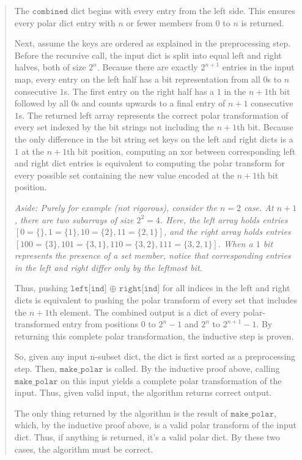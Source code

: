 \documentclass[11pt]{article}
\newcommand{\code}[1]{$\texttt{#1}$}
\begin{document}
\begin{enumerate}
\begin{enumerate}
\begin{quote}
    \medskip
    The \code{combined} dict begins with every entry from the left side. This ensures every polar dict entry with $n$ or fewer members from $0$ to $n$ is returned. 

    \medskip
    Next, assume the keys are ordered as explained in the preprocessing step. Before the recursive call, the input dict is split into equal left and right halves, both of size $2^n$. Because there are exactly $2^{n + 1}$ entries in the input map, every entry on the left half has a bit representation from all $0$s to $n$ consecutive $1$s. The first entry on the right half has a $1$ in the $n + 1$th bit followed by all $0$s and counts upwards to a final entry of $n + 1$ consecutive $1$s. The returned left array represents the correct polar transformation of every set indexed by the bit strings not including the $n + 1$th bit. Because the only difference in the bit string set keys on the left and right dicts is a $1$ at the $n + 1$th bit position, computing an xor between corresponding left and right dict entries is equivalent to computing the polar transform for every possible set containing the new value encoded at the $n + 1$th bit position. 

    \medskip
    \textit{Aside: Purely for example (not rigorous), consider the $n = 2$ case. At $n + 1$, there are two subarrays of size $2^2 = 4$.  Here, the left array holds entries $[0 = \{\}, 1 = \{1\}, 10 = \{2\}, 11 = \{2, 1\}]$, and the right array holds entries $[100 = \{3\}, 101 = \{3, 1\}, 110 = \{3, 2\}, 111 = \{3, 2, 1\}]$. When a $1$ bit represents the presence of a set member, notice that corresponding entries in the left and right differ only by the leftmost bit.}

    \medskip
    Thus, pushing \code{left[ind]} $\oplus$ \code{right[ind]} for all indices in the left and right dicts is equivalent to pushing the polar transform of every set that includes the $n + 1$th element. The combined output is a dict of every polar-transformed entry from positions $0$ to $2^n - 1$ and $2^n$ to $2^{n + 1} - 1$. By returning this complete polar transformation, the inductive step is proven.

    \medskip
    So, given any input n-subset dict, the dict is first sorted as a preprocessing step. Then, \code{make\_polar} is called. By the inductive proof above, calling \code{make\_polar} on this input yields a complete polar transformation of the input. Thus, given valid input, the algorithm returns correct output.

    \medskip
    The only thing returned by the algorithm is the result of \code{make\_polar}, which, by the inductive proof above, is a valid polar transform of the input dict. Thus, if anything is returned, it's a valid polar dict. By these two cases, the algorithm must be correct.


\end{quote}
\end{enumerate}
\end{enumerate}
\end{document}
